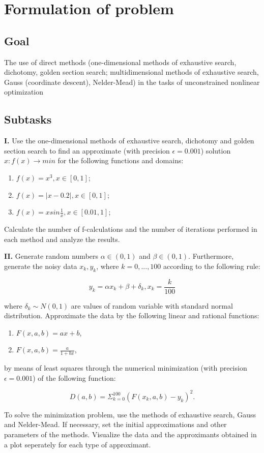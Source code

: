\section*{Formulation of problem}

\subsection*{Goal}
The use of direct methods (one-dimensional methods of exhaustive search,
dichotomy, golden section search; multidimensional methods of exhaustive search,
Gauss (coordinate descent), Nelder-Mead) in the tasks of unconstrained nonlinear
optimization
\subsection*{Subtasks}
\textbf{I.} Use the one-dimensional methods of exhaustive search,
dichotomy and golden section search to find an approximate (with precision $\epsilon = 0.001$) solution
$x: f(x) \rightarrow min$ for the following functions and domains:
\begin{enumerate}
    \item $f(x) = x^3, x \in [0, 1]$;
    \item $f(x) = |x - 0.2|, x \in [0, 1]$;
    \item $f(x) = x sin \frac{1}{x}, x \in [0.01, 1]$;
\end{enumerate}

Calculate the number of f-calculations and the number of iterations performed in each method and analyze the results.

\textbf{II.} Generate random numbers $\alpha \in (0, 1)$ and $\beta \in (0, 1)$. Furthermore, generate the noisy data ${x_k, y_k}$, where $k = 0, ..., 100$ according to the following rule:

\begin{equation*}
    y_k = \alpha x_k + \beta + \delta_k, x_k = \frac{k}{100}
\end{equation*}

where $\delta_k \sim N(0, 1)$ are values of random variable with standard normal distribution. Approximate the data by the following linear and rational functions:

\begin{enumerate}
    \item $F(x, a, b) = ax + b$,
    \item $F(x, a, b) = \frac{a}{1 + bx}$,
\end{enumerate}

by means of least squares through the numerical minimization (with precision $\epsilon = 0.001$) of the following function:

\begin{equation*}
    D(a, b) = \Sigma_{k=0}^{100} (F(x_k, a, b) - y_k)^2.
\end{equation*}

To solve the minimization problem, use the methods of exhaustive search, Gauss and Nelder-Mead. If necessary, set the initial approximations and other parameters of the methods.
Visualize the data and the approximants obtained in a plot seperately for each type of approximant.